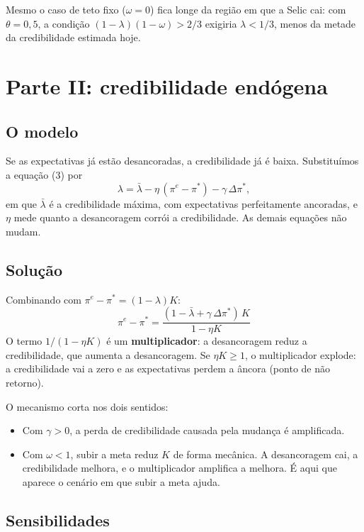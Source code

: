 \documentclass[11pt,a4paper]{article}
\newcommand{\pe}{\pi^{e}}
\newcommand{\meta}{\pi^{*}}
\newcommand{\dmeta}{\Delta\meta}
\begin{document}
Mesmo o caso de teto fixo ($\omega=0$) fica longe da região em que a Selic cai: com $\theta=0{,}5$, a condição $(1-\lambda)(1-\omega) > 2/3$ exigiria $\lambda < 1/3$, menos da metade da credibilidade estimada hoje.

\section{Parte II: credibilidade endógena}

\subsection{O modelo}

Se as expectativas já estão desancoradas, a credibilidade já é baixa. Substituímos a equação (3) por
\begin{equation}
\lambda = \bar\lambda - \eta\,(\pe - \meta) - \gamma\,\dmeta ,
\end{equation}
em que $\bar\lambda$ é a credibilidade máxima, com expectativas perfeitamente ancoradas, e $\eta$ mede quanto a desancoragem corrói a credibilidade. As demais equações não mudam.

\subsection{Solução}

Combinando com $\pe-\meta=(1-\lambda)K$:
\begin{equation}
\boxed{\;\pe - \meta = \frac{(1-\bar\lambda+\gamma\,\dmeta)\,K}{1-\eta K}\;}
\end{equation}
O termo $1/(1-\eta K)$ é um \textbf{multiplicador}: a desancoragem reduz a credibilidade, que aumenta a desancoragem. Se $\eta K \geq 1$, o multiplicador explode: a credibilidade vai a zero e as expectativas perdem a âncora (ponto de não retorno).

O mecanismo corta nos dois sentidos:
\begin{itemize}
  \item Com $\gamma>0$, a perda de credibilidade causada pela mudança é amplificada.
  \item Com $\omega<1$, subir a meta reduz $K$ de forma mecânica. A desancoragem cai, a credibilidade melhora, e o multiplicador amplifica a melhora. É aqui que aparece o cenário em que subir a meta ajuda.
\end{itemize}

\subsection{Sensibilidades}
\end{document}
